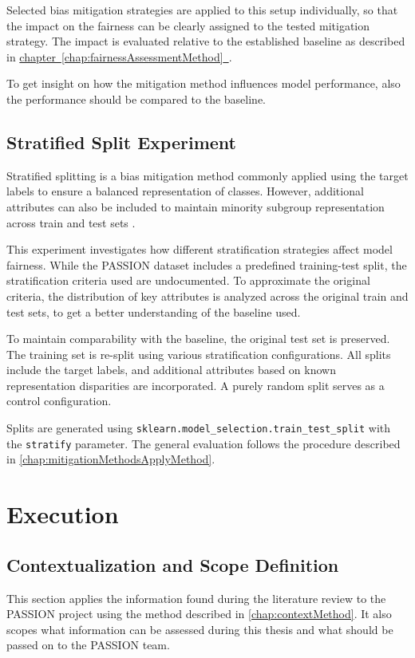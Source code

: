 \documentclass[12pt, a4paper, oneside]{book}   	%
\newcommand{\linkchap}[1]{\hyperref[#1]{chapter~\ref{#1}~\nameref{#1}}}
\begin{document}
		Selected bias mitigation strategies are applied to this setup individually, so that the impact on the fairness can be clearly assigned to the tested mitigation strategy. The impact is evaluated relative to the established baseline as described in \linkchap{chap:fairnessAssessmentMethod}.
		
		To get insight on how the mitigation method influences model performance, also the performance should be compared to the baseline.
		
		\section{Stratified Split Experiment}
		Stratified splitting is a bias mitigation method commonly applied using the target labels to ensure a balanced representation of classes. However, additional attributes can also be included to maintain minority subgroup representation across train and test sets \autocite{Balde_2023}.
		
		This experiment investigates how different stratification strategies affect model fairness. While the PASSION dataset includes a predefined training-test split, the stratification criteria used are undocumented. To approximate the original criteria, the distribution of key attributes is analyzed across the original train and test sets, to get a better understanding of the baseline used.
		
		To maintain comparability with the baseline, the original test set is preserved. The training set is re-split using various stratification configurations. All splits include the target labels, and additional attributes based on known representation disparities are incorporated. A purely random split serves as a control configuration.
		
		Splits are generated using \texttt{sklearn.model\_selection.train\_test\_split} with the \texttt{stratify} parameter. The general evaluation follows the procedure described in \autoref{chap:mitigationMethodsApplyMethod}.
		
	\chapter{Execution}
		\section{Contextualization and Scope Definition}
		This section applies the information found during the literature review to the PASSION project using the method described in \autoref{chap:contextMethod}. It also scopes what information can be assessed during this thesis and what should be passed on to the PASSION team.
		
\end{document}
